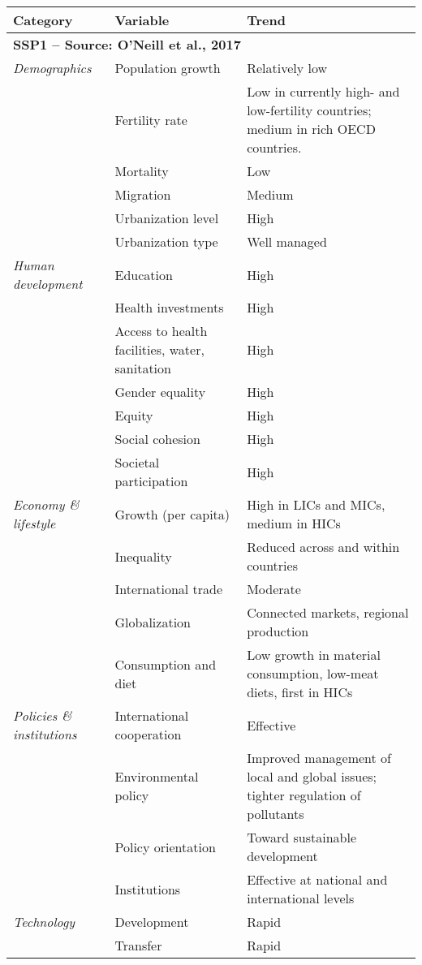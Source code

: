 {\scriptsize
\begin{longtable}{p{3cm}p{3.5cm}p{8cm}}
\toprule
Category & Variable & Trend \\ \midrule
\multicolumn{3}{l}{\textbf{SSP1 -- Source: O'Neill et al., 2017}}\\
\textit{Demographics} & Population growth & Relatively low\\
\textit{} & Fertility rate & Low in currently high- and low-fertility countries; medium in rich OECD countries.\\
\textit{} & Mortality & Low\\
\textit{} & Migration & Medium\\
\textit{} & Urbanization level & High\\
\textit{} & Urbanization type & Well managed\\
\textit{Human development} & Education & High\\
\textit{} & Health investments & High\\
\textit{} & Access to health facilities, water, sanitation & High\\
\textit{} & Gender equality & High\\
\textit{} & Equity & High\\
\textit{} & Social cohesion & High\\
\textit{} & Societal participation & High\\
\textit{Economy \& lifestyle} & Growth (per capita) & High in LICs and MICs, medium in HICs\\
\textit{} & Inequality & Reduced across and within countries\\
\textit{} & International trade & Moderate\\
\textit{} & Globalization & Connected markets, regional production\\
\textit{} & Consumption and diet & Low growth in material consumption, low-meat diets, first in HICs\\
\textit{Policies \& institutions} & International cooperation & Effective\\
\textit{} & Environmental policy & Improved management of local and global issues; tighter regulation of pollutants\\
\textit{} & Policy orientation & Toward sustainable development\\
\textit{} & Institutions & Effective at national and international levels\\
\textit{Technology} & Development & Rapid\\
\textit{} & Transfer & Rapid\\

\end{longtable}}
